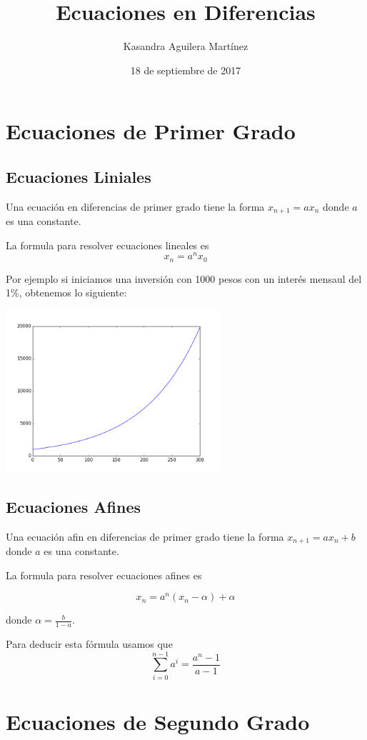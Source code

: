 \documentclass{article}
\title{Ecuaciones en Diferencias}
\author{Kasandra Aguilera Martínez}
\date{18 de septiembre de 2017}
\begin{document}
\maketitle


\section{Ecuaciones de Primer Grado}

\subsection{Ecuaciones Liniales}

Una ecuación en diferencias de primer grado tiene la forma $x_{n+1}=ax_n$ donde $a$ es una constante.

La formula para resolver ecuaciones lineales es 
\begin{equation}
  \label{eq:eq2}
x_n=a^nx_0
\end{equation}

Por ejemplo si iniciamos una inversión con 1000 pesos con un interés mensaul del 1\%, obtenemos lo siguiente:

\begin{center}
  \includegraphics[width=8cm]{inversion.png}
\end{center}


\subsection{Ecuaciones Afines}

Una ecuación afin en diferencias de primer grado tiene la forma $x_{n+1}=ax_n+b$ donde $a$ es una constante.

La formula para resolver ecuaciones afines es

\begin{equation}
  \label{eq:eq1}
  x_n=a^n(x_n-\alpha)+\alpha
\end{equation}

donde $\alpha=\frac{b}{1-a}$.

Para deducir esta fórmula usamos que $$\sum_{i=0}^{n-1}a^i=\frac{a^n-1}{a-1}$$

\section{Ecuaciones de Segundo Grado}

 
\end{document}
